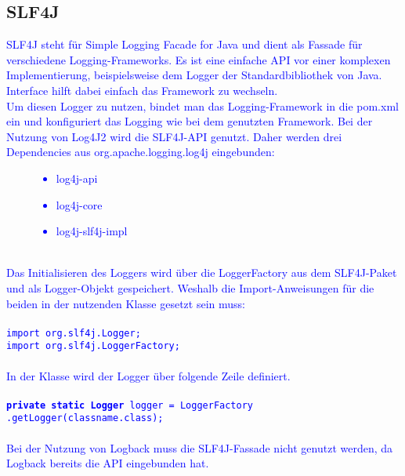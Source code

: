 \subsection{SLF4J}\label{subsec:slf4j}
\textcolor{blue}{
    SLF4J steht für Simple Logging Facade for Java und dient als Fassade für verschiedene Logging-Frameworks.
    Es ist eine einfache API vor einer komplexen Implementierung, beispielsweise dem Logger der Standardbibliothek von Java.
    Interface hilft dabei einfach das Framework zu wechseln.
    \\
    Um diesen Logger zu nutzen, bindet man das Logging-Framework in die pom.xml ein und konfiguriert das Logging wie bei dem genutzten Framework.
    Bei der Nutzung von Log4J2 wird die SLF4J-API genutzt.
    Daher werden drei Dependencies aus org.apache.logging.log4j eingebunden:
    \begin{figure}[h]
        \centering
        \textcolor{blue}{
            \begin{itemize}
                \item log4j-api
                \item log4j-core
                \item log4j-slf4j-impl
            \end{itemize}\label{fig:figure3}}
    \end{figure}
    \\
    Das Initialisieren des Loggers wird über die LoggerFactory aus dem SLF4J-Paket und als Logger-Objekt gespeichert.
    Weshalb die Import-Anweisungen für die beiden in der nutzenden Klasse gesetzt sein muss:
    \\
    \\
    \hspace*{10mm}
    \texttt{import org.slf4j.Logger;}
    \\
    \hspace*{10mm}
    \texttt{import org.slf4j.LoggerFactory;}
    \\
    \\
    In der Klasse wird der Logger über folgende Zeile definiert.
    \\
    \\
    \hspace*{10mm}
    \texttt{\textbf{private static Logger} logger = LoggerFactory
    \\
    \hspace*{30mm}
    .getLogger(classname.class);}
    \\
    \\
    Bei der Nutzung von Logback muss die SLF4J-Fassade nicht genutzt werden, da Logback bereits die API eingebunden hat.
}
